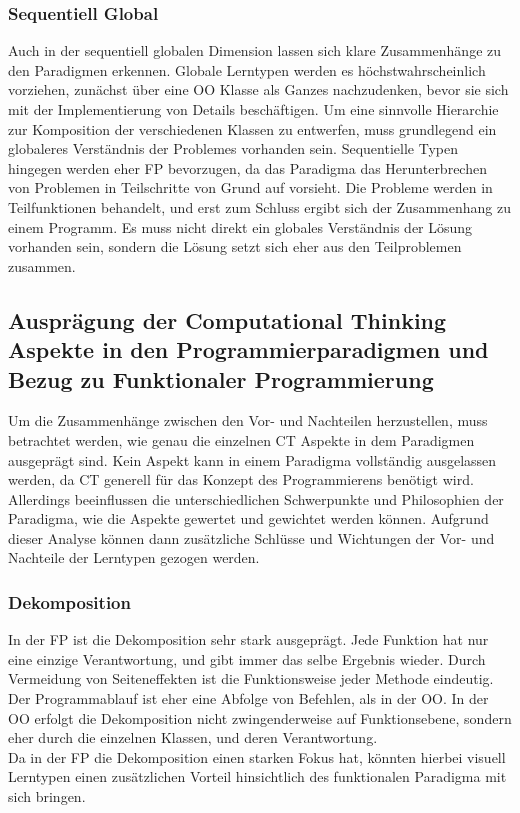 \subsubsection{Sequentiell Global}
Auch in der sequentiell globalen Dimension lassen sich klare Zusammenhänge zu den Paradigmen erkennen. Globale Lerntypen werden es höchstwahrscheinlich vorziehen, zunächst über eine OO Klasse als Ganzes nachzudenken, bevor sie sich mit der Implementierung von Details beschäftigen. Um eine sinnvolle Hierarchie zur Komposition der verschiedenen Klassen zu entwerfen, muss grundlegend ein globaleres Verständnis der Problemes vorhanden sein.
Sequentielle Typen hingegen werden eher FP bevorzugen, da das Paradigma das Herunterbrechen von Problemen in Teilschritte von Grund auf vorsieht. Die Probleme werden in Teilfunktionen behandelt, und erst zum Schluss ergibt sich der Zusammenhang zu einem Programm. Es muss nicht direkt ein globales Verständnis der Lösung vorhanden sein, sondern die Lösung setzt sich eher aus den Teilproblemen zusammen.

\subsection{Ausprägung der Computational Thinking Aspekte in den Programmierparadigmen und Bezug zu Funktionaler Programmierung}
Um die Zusammenhänge zwischen den Vor- und Nachteilen herzustellen, muss betrachtet werden, wie genau die einzelnen CT Aspekte in dem Paradigmen ausgeprägt sind. Kein Aspekt kann in einem Paradigma vollständig ausgelassen werden, da CT generell für das Konzept des Programmierens benötigt wird. Allerdings beeinflussen die unterschiedlichen Schwerpunkte und Philosophien der Paradigma, wie die Aspekte gewertet und gewichtet werden können. 
Aufgrund dieser Analyse können dann zusätzliche Schlüsse und Wichtungen der Vor- und Nachteile der Lerntypen gezogen werden.

\subsubsection{Dekomposition}
In der FP ist die Dekomposition sehr stark ausgeprägt. Jede Funktion hat nur eine einzige Verantwortung, und gibt immer das selbe Ergebnis wieder. Durch Vermeidung von Seiteneffekten ist die Funktionsweise jeder Methode eindeutig. Der Programmablauf ist eher eine Abfolge von Befehlen, als in der OO. In der OO erfolgt die Dekomposition nicht zwingenderweise auf Funktionsebene, sondern eher durch die einzelnen Klassen, und deren Verantwortung.
\\
Da in der FP die Dekomposition einen starken Fokus hat, könnten hierbei visuell Lerntypen einen zusätzlichen Vorteil hinsichtlich des funktionalen Paradigma mit sich bringen.

